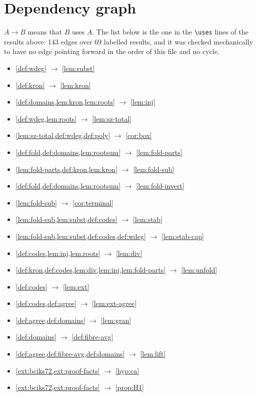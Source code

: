 \section{Dependency graph}

\noindent $A\to B$ means that $B$ uses $A$. The list below is the one in the \verb|\uses| lines of
the results above: 143 edges over 69 labelled results, and it was checked mechanically to have no
edge pointing forward in the order of this file and no cycle.

\begin{itemize}
\item \cref{def:wdeg} $\to$ \cref{lem:subst}
\item \cref{def:kron} $\to$ \cref{lem:kron}
\item \cref{def:domains,lem:kron,lem:roots} $\to$ \cref{lem:inj}
\item \cref{def:wdeg,lem:roots} $\to$ \cref{lem:sz-total}
\item \cref{lem:sz-total,def:wdeg,def:poly} $\to$ \cref{cor:box}
\item \cref{def:fold,def:domains,lem:rootsum} $\to$ \cref{lem:fold-parts}
\item \cref{lem:fold-parts,def:kron,lem:kron} $\to$ \cref{lem:fold-sub}
\item \cref{def:fold,def:domains,lem:rootsum} $\to$ \cref{lem:fold-invert}
\item \cref{lem:fold-sub} $\to$ \cref{cor:terminal}
\item \cref{lem:fold-sub,lem:subst,def:codes} $\to$ \cref{lem:stab}
\item \cref{lem:fold-sub,lem:subst,def:codes,def:wdeg} $\to$ \cref{lem:stab-cap}
\item \cref{def:codes,lem:inj,lem:roots} $\to$ \cref{lem:div}
\item \cref{def:kron,def:codes,lem:div,lem:inj,lem:fold-parts} $\to$ \cref{lem:unfold}
\item \cref{def:codes} $\to$ \cref{lem:ext}
\item \cref{def:codes,def:agree} $\to$ \cref{lem:ext-agree}
\item \cref{def:agree,def:domains} $\to$ \cref{lem:gran}
\item \cref{def:domains} $\to$ \cref{def:fibre-avg}
\item \cref{def:agree,def:fibre-avg,def:domains} $\to$ \cref{lem:lift}
\item \cref{ext:bciks72,ext:proof-facts} $\to$ \cref{hyp:ca}
\item \cref{ext:bciks72,ext:proof-facts} $\to$ \cref{prop:H1}

\end{itemize}
